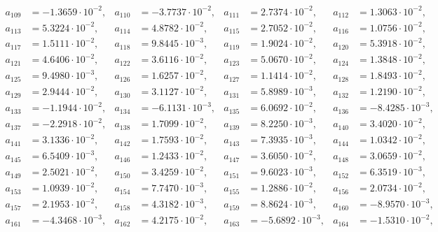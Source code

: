 \begin{align*}
a_{ 109 } &= -1.3659 \cdot 10^{ -2 }, & a_{ 110 } &= -3.7737 \cdot 10^{ -2 }, & a_{ 111 } &= 2.7374 \cdot 10^{ -2 }, & a_{ 112 } &= 1.3063 \cdot 10^{ -2 },\\ 
a_{ 113 } &= 5.3224 \cdot 10^{ -2 }, & a_{ 114 } &= 4.8782 \cdot 10^{ -2 }, & a_{ 115 } &= 2.7052 \cdot 10^{ -2 }, & a_{ 116 } &= 1.0756 \cdot 10^{ -2 },\\ 
a_{ 117 } &= 1.5111 \cdot 10^{ -2 }, & a_{ 118 } &= 9.8445 \cdot 10^{ -3 }, & a_{ 119 } &= 1.9024 \cdot 10^{ -2 }, & a_{ 120 } &= 5.3918 \cdot 10^{ -2 },\\ 
a_{ 121 } &= 4.6406 \cdot 10^{ -2 }, & a_{ 122 } &= 3.6116 \cdot 10^{ -2 }, & a_{ 123 } &= 5.0670 \cdot 10^{ -2 }, & a_{ 124 } &= 1.3848 \cdot 10^{ -2 },\\ 
a_{ 125 } &= 9.4980 \cdot 10^{ -3 }, & a_{ 126 } &= 1.6257 \cdot 10^{ -2 }, & a_{ 127 } &= 1.1414 \cdot 10^{ -2 }, & a_{ 128 } &= 1.8493 \cdot 10^{ -2 },\\ 
a_{ 129 } &= 2.9444 \cdot 10^{ -2 }, & a_{ 130 } &= 3.1127 \cdot 10^{ -2 }, & a_{ 131 } &= 5.8989 \cdot 10^{ -3 }, & a_{ 132 } &= 1.2190 \cdot 10^{ -2 },\\ 
a_{ 133 } &= -1.1944 \cdot 10^{ -2 }, & a_{ 134 } &= -6.1131 \cdot 10^{ -3 }, & a_{ 135 } &= 6.0692 \cdot 10^{ -2 }, & a_{ 136 } &= -8.4285 \cdot 10^{ -3 },\\ 
a_{ 137 } &= -2.2918 \cdot 10^{ -2 }, & a_{ 138 } &= 1.7099 \cdot 10^{ -2 }, & a_{ 139 } &= 8.2250 \cdot 10^{ -3 }, & a_{ 140 } &= 3.4020 \cdot 10^{ -2 },\\ 
a_{ 141 } &= 3.1336 \cdot 10^{ -2 }, & a_{ 142 } &= 1.7593 \cdot 10^{ -2 }, & a_{ 143 } &= 7.3935 \cdot 10^{ -3 }, & a_{ 144 } &= 1.0342 \cdot 10^{ -2 },\\ 
a_{ 145 } &= 6.5409 \cdot 10^{ -3 }, & a_{ 146 } &= 1.2433 \cdot 10^{ -2 }, & a_{ 147 } &= 3.6050 \cdot 10^{ -2 }, & a_{ 148 } &= 3.0659 \cdot 10^{ -2 },\\ 
a_{ 149 } &= 2.5021 \cdot 10^{ -2 }, & a_{ 150 } &= 3.4259 \cdot 10^{ -2 }, & a_{ 151 } &= 9.6023 \cdot 10^{ -3 }, & a_{ 152 } &= 6.3519 \cdot 10^{ -3 },\\ 
a_{ 153 } &= 1.0939 \cdot 10^{ -2 }, & a_{ 154 } &= 7.7470 \cdot 10^{ -3 }, & a_{ 155 } &= 1.2886 \cdot 10^{ -2 }, & a_{ 156 } &= 2.0734 \cdot 10^{ -2 },\\ 
a_{ 157 } &= 2.1953 \cdot 10^{ -2 }, & a_{ 158 } &= 4.3182 \cdot 10^{ -3 }, & a_{ 159 } &= 8.8624 \cdot 10^{ -3 }, & a_{ 160 } &= -8.9570 \cdot 10^{ -3 },\\ 
a_{ 161 } &= -4.3468 \cdot 10^{ -3 }, & a_{ 162 } &= 4.2175 \cdot 10^{ -2 }, & a_{ 163 } &= -5.6892 \cdot 10^{ -3 }, & a_{ 164 } &= -1.5310 \cdot 10^{ -2 },\\ 

\end{align*}
